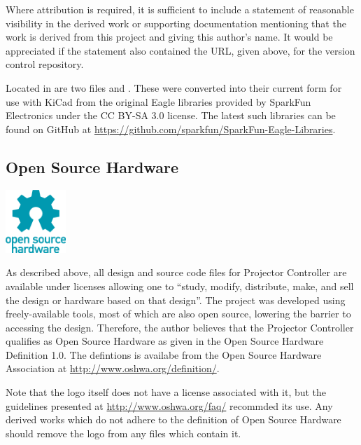 \documentclass{article}
\begin{document}
Where attribution is required, it is sufficient to include a statement of reasonable visibility in
the derived work or supporting documentation mentioning that the work is derived from this project
and giving this author's name.  It would be appreciated if the statement also contained the URL,
given above, for the version control repository.

Located in  are two files  and
.  These were converted into their current form for use with KiCad from the
original Eagle libraries provided by SparkFun Electronics under the CC BY-SA 3.0 license.  The
latest such libraries can be found on GitHub at
\url{https://github.com/sparkfun/SparkFun-Eagle-Libraries}.

\subsection{Open Source Hardware} \label{ssec:OpenSourceHW}
\begin{floatingfigure}{0.22\textwidth}
    \centering
    \vspace{-6pt}
    \includegraphics[width=0.17\textwidth]{oshw-logo-200-px}
\end{floatingfigure}

As described above, all design and source code files for Projector Controller are available under
licenses allowing one to ``study, modify, distribute, make, and sell the design or hardware based on
that design''.  The project was developed using freely-available tools, most of which are also open
source, lowering the barrier to accessing the design.  Therefore, the author believes that the
Projector Controller qualifies as Open Source Hardware as given in the Open Source Hardware
Definition 1.0.  The defintions is availabe from the Open Source Hardware Association at
\url{http://www.oshwa.org/definition/}.

Note that the logo itself does not have a license associated with it, but the guidelines presented
at \url{http://www.oshwa.org/faq/} recommded its use.  Any derived works which do not adhere to the
definition of Open Source Hardware should remove the logo from any files which contain it.
\end{document}
